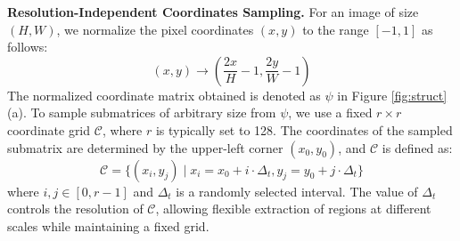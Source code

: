 \documentclass{article}
\begin{document}




\textbf{Resolution-Independent Coordinates Sampling.}
For an image of size $(H, W)$, we normalize the pixel coordinates $(x, y)$ to the range $[-1, 1]$ as follows:
\begin{equation}
(x, y) \rightarrow \left( \frac{2x}{H} - 1, \frac{2y}{W} - 1 \right)
\end{equation}
The normalized coordinate matrix obtained is denoted as $\psi$ in Figure  \ref{fig:struct} (a). To sample submatrices of arbitrary size from $\psi$, we use a fixed $r \times r$ coordinate grid $\mathcal{C}$, where $r$ is typically set to 128. The coordinates of the sampled submatrix are determined by the upper-left corner $(x_0, y_0)$, and $\mathcal{C}$ is defined as:
\begin{equation}
   \mathcal{C} = \{ (x_i, y_j) \mid x_i = x_0 + i \cdot \Delta_t, y_j = y_0 + j \cdot \Delta_t \} 
\end{equation}
where $i,j \in [0, r-1]$ and $\Delta_t$ is a randomly selected interval. The value of $\Delta_t$ controls the resolution of $\mathcal{C}$, allowing flexible extraction of regions at different scales while maintaining a fixed grid.
\end{document}
